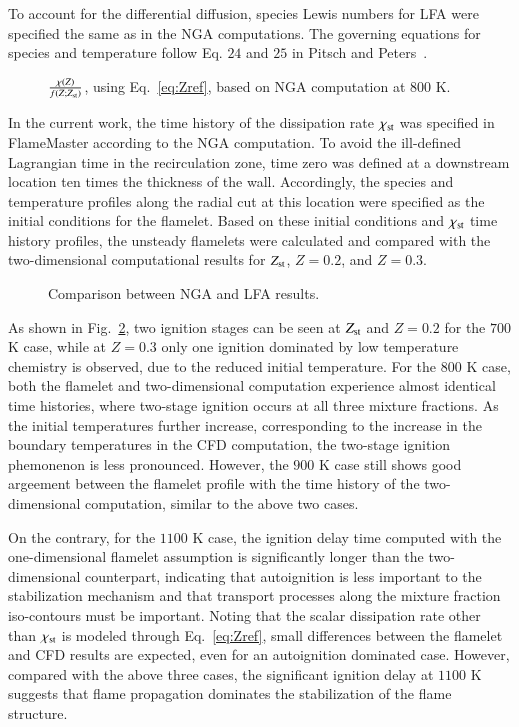 \documentclass[review,3p,times]{elsarticle}
\begin{document}
To account for the differential diffusion, species Lewis numbers for LFA  were specified the same as in the NGA computations.  The governing equations for species and temperature follow Eq. $24$ and $25$ in Pitsch and Peters~\cite{pitsch98b}.

\begin{figure}
  \centering
  \scriptsize
  
  \normalsize
  \caption{$\frac{\chi(Z)}{f(Z;Z_{\rm st})}$, using Eq.~\ref{eq:Zref}, based on NGA computation at $800$ K.}
  \label{fig:Zref}
\end{figure}

In the current work, the time history of the dissipation rate $\chi_{\rm st}$ was specified in FlameMaster according to the NGA computation.  To avoid the ill-defined Lagrangian time in the recirculation zone, time zero was defined at a downstream location ten times the thickness of the wall.  Accordingly, the species and temperature profiles along the radial cut at this location were specified as the initial conditions for the flamelet.  Based on these initial conditions and $\chi_{\rm st}$ time history profiles, the unsteady flamelets were calculated and compared with the two-dimensional computational results for $Z_{\rm st}$, $Z = 0.2$, and $Z = 0.3$.       

\begin{figure}
  \centering
  \scriptsize
  
  \normalsize
  \caption{Comparison between NGA and LFA results.}
  \label{fig:LFA}
\end{figure}

As shown in Fig.~\ref{fig:LFA}, two ignition stages can be seen at $Z_{\rm st}$ and $Z = 0.2$ for the $700$ K case, while at $Z = 0.3$ only one ignition dominated by low temperature chemistry is observed, due to the reduced initial temperature.   For the $800$ K case, both the flamelet and two-dimensional computation experience almost identical time histories, where two-stage ignition occurs at all three mixture fractions.  As the initial temperatures further increase, corresponding to the increase in the boundary temperatures in the CFD computation, the two-stage ignition phemonenon is less pronounced.  However, the $900$ K case still shows good argeement between the flamelet profile with the time history of the two-dimensional computation, similar to the above two cases.  
  
On the contrary, for the $1100$ K case, the ignition delay time computed with the one-dimensional flamelet assumption is significantly longer than the two-dimensional counterpart, indicating that autoignition is less important to the stabilization mechanism and that transport processes along the mixture fraction iso-contours must be important.  Noting that the scalar dissipation rate other than $\chi_{\rm st}$ is modeled through Eq.~\ref{eq:Zref}, small differences between the flamelet and CFD results are expected, even for an autoignition dominated case.  However, compared with the above three cases, the significant ignition delay at $1100$ K suggests that flame propagation dominates the stabilization of the flame structure.      
\end{document}
